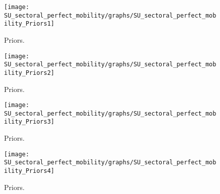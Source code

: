 
\begin{figure}[H]
\centering
\texttt{[image: SU\_sectoral\_perfect\_mobility/graphs/SU\_sectoral\_perfect\_mobility\_Priors1]}
\caption{Priors.}\label{Fig:Priors:1}
\end{figure}
\begin{figure}[H]
\centering
\texttt{[image: SU\_sectoral\_perfect\_mobility/graphs/SU\_sectoral\_perfect\_mobility\_Priors2]}
\caption{Priors.}\label{Fig:Priors:2}
\end{figure}
\begin{figure}[H]
\centering
\texttt{[image: SU\_sectoral\_perfect\_mobility/graphs/SU\_sectoral\_perfect\_mobility\_Priors3]}
\caption{Priors.}\label{Fig:Priors:3}
\end{figure}
\begin{figure}[H]
\centering
\texttt{[image: SU\_sectoral\_perfect\_mobility/graphs/SU\_sectoral\_perfect\_mobility\_Priors4]}
\caption{Priors.}\label{Fig:Priors:4}
\end{figure}
 

